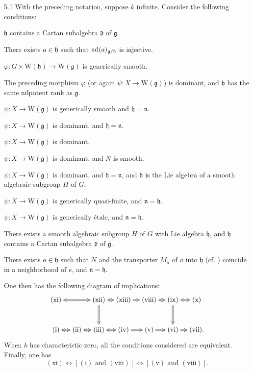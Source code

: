 \begin{theorem}{5.1}\label{XIII.5.1}
With the preceding notation, suppose $k$ infinite. Consider the
following conditions:
\begin{enumeratei}
\item $\mathfrak h$ contains a Cartan subalgebra $\mathfrak d$ of
$\mathfrak g$.
\item There exists $a\in\mathfrak h$ such that
$\operatorname{ad}(a)_{\mathfrak g/\mathfrak h}$ is injective.
\item $\varphi:G\times\mathrm W(\mathfrak h)\to\mathrm W(\mathfrak g)$
is generically smooth.
\item The preceding morphism $\varphi$ (or again
$\psi:X\to\mathrm W(\mathfrak g)$) is dominant, and $\mathfrak h$
has the same nilpotent rank as $\mathfrak g$.
\item $\psi:X\to\mathrm W(\mathfrak g)$ is generically smooth and
$\mathfrak h=\mathfrak n$.
\item $\psi:X\to\mathrm W(\mathfrak g)$ is dominant, and
$\mathfrak h=\mathfrak n$.
\item $\psi:X\to\mathrm W(\mathfrak g)$ is dominant.
\item $\psi:X\to\mathrm W(\mathfrak g)$ is dominant, and $N$ is smooth.
\item $\psi:X\to\mathrm W(\mathfrak g)$ is dominant, and
$\mathfrak h=\mathfrak n$, and $\mathfrak h$ is the Lie algebra of
a smooth algebraic subgroup $H$ of $G$.
\item $\psi:X\to\mathrm W(\mathfrak g)$ is generically quasi-finite,
and $\mathfrak n=\mathfrak h$.
\item $\psi:X\to\mathrm W(\mathfrak g)$ is generically \'etale,
and $\mathfrak n=\mathfrak h$.
\item There exists a smooth algebraic subgroup $H$ of $G$ with
Lie algebra $\mathfrak h$, and $\mathfrak h$ contains a Cartan
subalgebra $\mathfrak d$ of $\mathfrak g$.
\item There exists $a\in\mathfrak h$ such that $N$ and the transporter
$M_a$ of $a$ into $\mathfrak h$ (cf. ) coincide in a neighborhood
of $e$, and $\mathfrak n=\mathfrak h$.
\end{enumeratei}
One then has the following diagram of implications:
\[
\xymatrix@C=1em@R=2.8em{
 (\mathrm{xi})\ar@{<=>}[rr]&&
 (\mathrm{xii})\ar@{<=>}[r]\ar@{=>}[d]&
 (\mathrm{xiii})\ar@{=>}[r]&
 (\mathrm{viii})\ar@{<=>}[r]&
 (\mathrm{ix})\ar@{<=>}[r]\ar@{=>}[d]&(\mathrm{x})\\
 (\mathrm{i})\ar@{<=>}[r]&
 (\mathrm{ii})\ar@{<=>}[r]&
 (\mathrm{iii})\ar@{<=>}[r]&
 (\mathrm{iv})\ar@{=>}[r]&
 (\mathrm{v})\ar@{=>}[r]&
 (\mathrm{vi})\ar@{=>}[r]&(\mathrm{vii}).
}
\]
When $k$ has characteristic zero, all the conditions considered are
equivalent. Finally, one has
\[
 (\mathrm{xi})\Leftrightarrow[(\mathrm{i})\text{ and }(\mathrm{viii})]
 \Leftrightarrow[(\mathrm{v})\text{ and }(\mathrm{viii})].
\]
\end{theorem}
